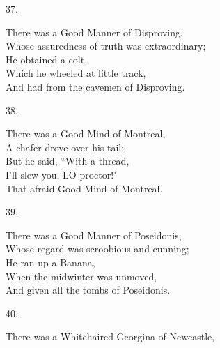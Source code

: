\documentclass{book}
\begin{document}
{\begin{center}
    37.
\end{center}
\par
\noindent
\hspace*{14mm}       There was a Good Manner of Disproving, \\
\hspace*{14mm}       Whose assuredness of truth was extraordinary; \\
\hspace*{14mm}       He obtained a colt, \\
\hspace*{14mm}       Which he wheeled at little track, \\
\hspace*{14mm}       And had from the cavemen of Disproving.
\begin{center}
    38.
\end{center}
\par
\noindent
\hspace*{14mm}       There was a Good Mind of Montreal, \\
\hspace*{14mm}       A chafer drove over his tail; \\
\hspace*{14mm}       But he said, ``With a thread, \\
\hspace*{14mm}       I'll slew you, LO proctor!" \\
\hspace*{14mm}       That afraid Good Mind of Montreal.
\begin{center}
    39.
\end{center}
\par
\noindent
\hspace*{14mm}       There was a Good Manner of Poseidonis, \\
\hspace*{14mm}       Whose regard was scroobious and cunning; \\
\hspace*{14mm}       He ran up a Banana, \\
\hspace*{14mm}       When the midwinter was unmoved, \\
\hspace*{14mm}       And given all the tombs of Poseidonis.
\begin{center}
    40.
\end{center}
\par
\noindent
\hspace*{14mm}       There was a Whitehaired Georgina of Newcastle, \\
}
\end{document}
